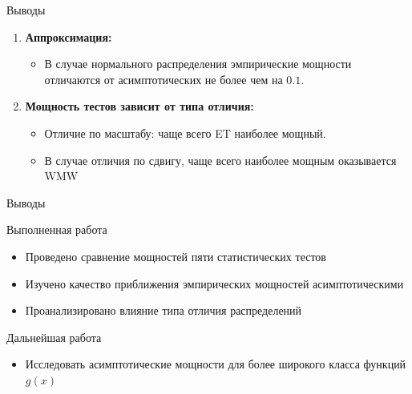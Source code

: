 \documentclass[handout]{beamer}
\begin{document}
\begin{frame}{Выводы}
    \begin{enumerate}
        \item \textbf{Аппроксимация:}
        \begin{itemize}
        \item
        В случае нормального распределения эмпирические мощности отличаются от асимптотических не более чем на $0.1$.
    	\end{itemize}
		\pause
        \item \textbf{Мощность тестов зависит от типа отличия:}
        \begin{itemize}
            \item Отличие по масштабу: чаще всего ET наиболее мощный.
            \item В случае отличия по сдвигу, чаще всего наиболее мощным оказывается WMW
        \end{itemize}
       
    \end{enumerate}
\end{frame}

\begin{frame}{Выводы}
    \begin{block}{Выполненная работа}
        \begin{itemize}
            \item Проведено сравнение мощностей пяти статистических тестов
            \item Изучено качество приближения эмпирических мощностей асимптотическими
            \item Проанализировано влияние типа отличия распределений
        \end{itemize}
    \end{block}
    \pause
    \begin{block}{Дальнейшая работа}
        \begin{itemize}
            \item Исследовать асимптотические мощности для более широкого класса функций $g(x)$
        \end{itemize}
    \end{block}
\end{frame}
\end{document}
